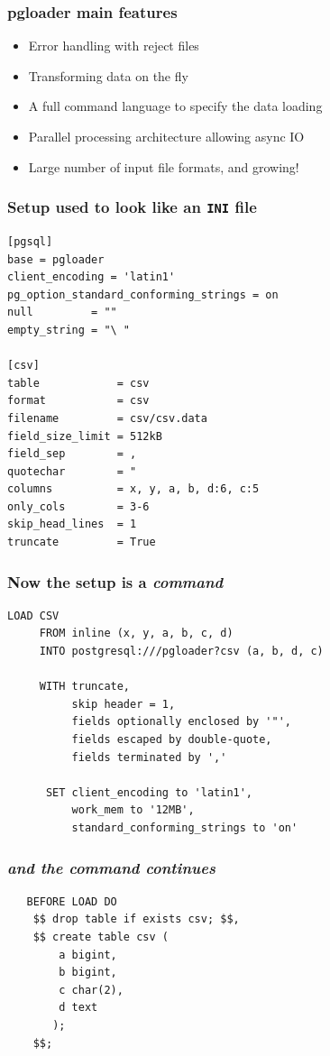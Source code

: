 \documentclass{beamer}
\begin{document}
\begin{frame}[fragile]
  \frametitle{pgloader main features}

  \vfill
  
  \begin{itemize}
  \item Error handling with reject files
  \item Transforming data on the fly
  \item A full command language to specify the data loading
  \item Parallel processing architecture allowing async IO
  \item Large number of input file formats, and growing!
  \end{itemize}
  
\end{frame}

\begin{frame}[fragile]
  \frametitle{Setup used to look like an \texttt{INI} file}

  \begin{verbatim}
[pgsql]
base = pgloader
client_encoding = 'latin1'
pg_option_standard_conforming_strings = on
null         = ""
empty_string = "\ "
    
[csv]
table            = csv
format           = csv
filename         = csv/csv.data
field_size_limit = 512kB
field_sep        = ,
quotechar        = "
columns          = x, y, a, b, d:6, c:5
only_cols        = 3-6
skip_head_lines  = 1
truncate         = True
  \end{verbatim}
\end{frame}

\begin{frame}[fragile]
  \frametitle{Now the setup is a \textit{command}}

  \begin{verbatim}
LOAD CSV
     FROM inline (x, y, a, b, c, d)
     INTO postgresql:///pgloader?csv (a, b, d, c)

     WITH truncate,
          skip header = 1,
          fields optionally enclosed by '"',
          fields escaped by double-quote,
          fields terminated by ','

      SET client_encoding to 'latin1',
          work_mem to '12MB',
          standard_conforming_strings to 'on'
  \end{verbatim}
\end{frame}

\begin{frame}[fragile]
  \frametitle{\textit{and the command continues}}

  \begin{verbatim}
   BEFORE LOAD DO
    $$ drop table if exists csv; $$,
    $$ create table csv (
        a bigint,
        b bigint,
        c char(2),
        d text
       );
    $$;
  \end{verbatim}
\end{frame}
\end{document}
